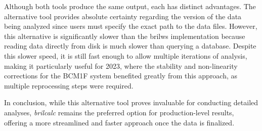 Although both tools produce the same output, each has distinct advantages. The alternative tool provides absolute certainty regarding the version of the data being analyzed since users must specify the exact path to the data files. However, this alternative is significantly slower than the brilws implementation because reading data directly from disk is much slower than querying a database. Despite this slower speed, it is still fast enough to allow multiple iterations of analysis, making it particularly useful for 2023, where the stability and non-linearity corrections for the BCM1F system benefited greatly from this approach, as multiple reprocessing steps were required.

In conclusion, while this alternative tool proves invaluable for conducting detailed analyses, \textit{brilcalc} remains the preferred option for production-level results, offering a more streamlined and faster approach once the data is finalized.
